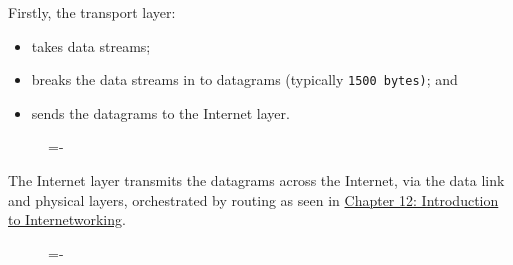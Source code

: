 \documentclass[a4paper]{systems-software}
\begin{document}
Firstly, the transport layer:
\begin{itemize}
	\item takes data streams;
	\item breaks the data streams in to datagrams (typically \texttt{1500 bytes)}; and
	\item sends the datagrams to the Internet layer.
\end{itemize}


\begin{figure}[H]
	\lineskip=-\fboxrule
\end{figure}

The Internet layer transmits the datagrams across the Internet, via the data link and physical layers, orchestrated by routing as seen in \hyperref[chap:17]{Chapter 12: Introduction to Internetworking}.


\begin{figure}[H]
	\lineskip=-\fboxrule
\end{figure}
\end{document}
